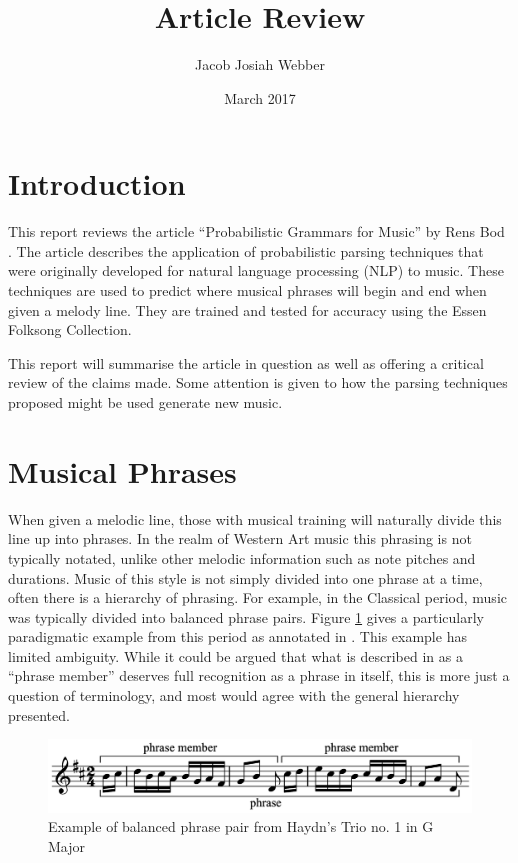 \documentclass[a4paper,12pt]{article}
\title{Article Review}
\author{Jacob Josiah Webber}
\date{March 2017}
\begin{document}
\maketitle

\section{Introduction}
This report reviews the article ``Probabilistic Grammars for Music'' by Rens Bod \cite{Bod_probabilisticgrammars}. The article describes the application of probabilistic parsing techniques that were originally developed for natural language processing (NLP) to music. These techniques are used to predict where musical phrases will begin and end when given a melody line. They are trained and tested for accuracy using the Essen Folksong Collection.

This report will summarise the article in question as well as offering a critical review of the claims made. Some attention is given to how the parsing techniques proposed might be used generate new music.



\section{Musical Phrases}
\label{phrases}
When given a melodic line, those with musical training will naturally divide this line up into phrases. In the realm of Western Art music this phrasing is not typically notated, unlike other melodic information such as note pitches and durations. Music of this style is not simply divided into one phrase at a time, often there is a hierarchy of phrasing. For example, in the Classical period, music was typically divided into balanced phrase pairs. Figure \ref{haydn} gives a particularly paradigmatic example from this period as annotated in \cite{music-theory}. This example has limited ambiguity. While it could be argued that what is described in \cite{music-theory} as a ``phrase member'' deserves full recognition as a phrase in itself, this is more just a question of terminology, and most would agree with the general hierarchy presented.

\begin{figure}
\centering
\includegraphics[width=\textwidth]{diagrams/Haydn}
\caption{Example of balanced phrase pair from  Haydn's Trio no. 1 in G Major}
\label{haydn}
\end{figure}
\end{document}
